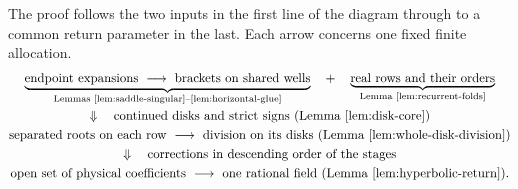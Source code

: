 The proof follows the two inputs in the first line of the diagram through to a common return parameter in the last. Each arrow concerns one fixed finite allocation.
\[
\begin{gathered}
 \underbrace{\text{endpoint expansions}\ \longrightarrow\
   \text{brackets on shared wells}}_{\text{Lemmas \ref{lem:saddle-singular}--\ref{lem:horizontal-glue}}}
 \quad+\quad
 \underbrace{\text{real rows and their orders}}_{\text{Lemma \ref{lem:recurrent-folds}}}
 \\[-1pt]
 \Downarrow\quad\text{continued disks and strict signs (Lemma \ref{lem:disk-core})}\\
 \text{separated roots on each row}\ \longrightarrow\
 \text{division on its disks (Lemma \ref{lem:whole-disk-division})}\\
 \Downarrow\quad\text{corrections in descending order of the stages}\\
 \text{open set of physical coefficients}\ \longrightarrow\
 \text{one rational field (Lemma \ref{lem:hyperbolic-return}).}
\end{gathered}
\]
